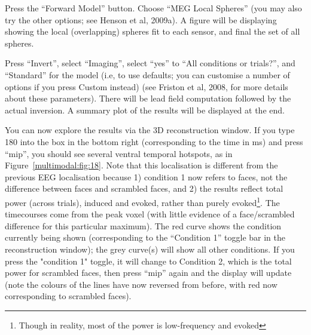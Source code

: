 Press the ``Forward Model'' button. Choose ``MEG Local Spheres'' (you may also try the other options; see Henson et al, 2009a). A figure will be displaying showing the local (overlapping) spheres fit to each sensor, and final the set of all spheres.

Press ``Invert'', select ``Imaging'', select ``yes'' to ``All conditions or trials?'', and ``Standard'' for the model (i.e, to use defaults; you can customise a number of options if you press Custom instead) (see Friston et al, 2008, for more details about these parameters). There will be lead field computation followed by the actual inversion. A summary plot of the results will be displayed at the end.

You can now explore the results via the 3D reconstruction window. If you type 180 into the box in the bottom right (corresponding to the time in ms) and press ``mip'', you should see several ventral temporal hotspots, as in Figure~\ref{multimodal:fig:18}. Note that this localisation is different from the previous EEG localisation because 1) condition 1 now refers to faces, not the difference between faces and scrambled faces, and 2) the results reflect total power (across trials), induced and evoked, rather than purely evoked\footnote{Though in reality, most of the power is low-frequency and evoked}. The timecourses come from the peak voxel (with little evidence of a face/scrambled difference for this particular maximum). The red curve shows the condition currently being shown (corresponding to the ``Condition 1'' toggle bar in the reconstruction window); the grey curve(s) will show all other conditions. If you press the "condition 1" toggle, it will change to Condition 2, which is the total power for scrambled faces, then press ``mip'' again and the display will update (note the colours of the lines have now reversed from before, with red now corresponding to scrambled faces).

